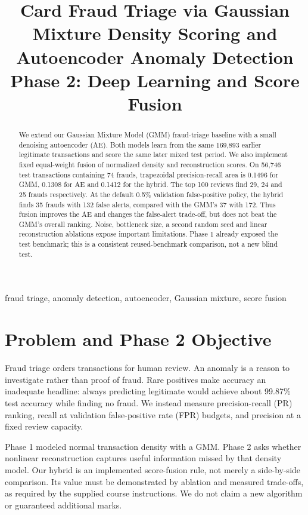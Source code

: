 \documentclass[conference]{IEEEtran}
\title{Card Fraud Triage via Gaussian Mixture Density Scoring and Autoencoder Anomaly Detection\\Phase 2: Deep Learning and Score Fusion}
\author{\IEEEauthorblockN{H Maheshwari, Vaibhav, Mayank, Keshav, Mitul Bhatia}
\IEEEauthorblockA{Team T011, Section A, Project 26\\Newton School of Technology, Rishihood University\\
2401010174, 2401010486, 2401010267, 2401010222, 2401010279}}
\begin{document}
\maketitle
\begin{abstract}
We extend our Gaussian Mixture Model (GMM) fraud-triage baseline with a small denoising autoencoder (AE). Both models learn from the same 169,893 earlier legitimate transactions and score the same later mixed test period. We also implement fixed equal-weight fusion of normalized density and reconstruction scores. On 56,746 test transactions containing 74 frauds, trapezoidal precision-recall area is 0.1496 for GMM, 0.1308 for AE and 0.1412 for the hybrid. The top 100 reviews find 29, 24 and 25 frauds respectively. At the default 0.5\% validation false-positive policy, the hybrid finds 35 frauds with 132 false alerts, compared with the GMM's 37 with 172. Thus fusion improves the AE and changes the false-alert trade-off, but does not beat the GMM's overall ranking. Noise, bottleneck size, a second random seed and linear reconstruction ablations expose important limitations. Phase 1 already exposed the test benchmark; this is a consistent reused-benchmark comparison, not a new blind test.
\end{abstract}
\begin{IEEEkeywords}fraud triage, anomaly detection, autoencoder, Gaussian mixture, score fusion\end{IEEEkeywords}

\section{Problem and Phase 2 Objective}
Fraud triage orders transactions for human review. An anomaly is a reason to investigate rather than proof of fraud. Rare positives make accuracy an inadequate headline: always predicting legitimate would achieve about 99.87\% test accuracy while finding no fraud. We instead measure precision-recall (PR) ranking, recall at validation false-positive rate (FPR) budgets, and precision at a fixed review capacity.

Phase 1 modeled normal transaction density with a GMM. Phase 2 asks whether nonlinear reconstruction captures useful information missed by that density model. Our hybrid is an implemented score-fusion rule, not merely a side-by-side comparison. Its value must be demonstrated by ablation and measured trade-offs, as required by the supplied course instructions. We do not claim a new algorithm or guaranteed additional marks.
\end{document}
